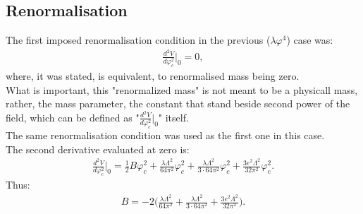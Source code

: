 \subsection{Renormalisation}\label{CW_renormalisation_scalar_el}
The first imposed renormalisation condition in the previous ($\lambda\varphi^4$) case was:
\begin{align}\label{phitoforth condition}
\frac{d^2V}{d\varphi_c^2}\Big|_0=0,
\end{align}
where, it was stated, is equivalent, to renormalised mass being zero. \\
What is important, this "renormalized mass" is not meant to be a physicall mass, rather, 
the mass parameter, the constant that stand beside second power of the field, 
which can be defined as "$\frac{d^2V}{d\varphi_c^2}\Big|_0$" itself. \\
The same renormalisation condition was used as the first one in this case. \\
The second derivative evaluated at zero is:
\begin{align}
\frac{d^2V}{d\varphi_c^2}\Big|_0 = 
\frac{1}{2}B\varphi_c^2 + 
\frac{\lambda\Lambda^2}{64\pi^2}\varphi_c^2+ 
\frac{\lambda\Lambda^2}{3\cdot 64\pi^2}\varphi_c^2+
\frac{3e^2\Lambda^2}{32\pi^2}\varphi_c^2. 
\end{align}
Thus:
\begin{align}\label{CW_B_dm}
B = -2\Big(
\frac{\lambda\Lambda^2}{64\pi^2}+ 
\frac{\lambda\Lambda^2}{3\cdot 64\pi^2}+
\frac{3e^2\Lambda^2}{32\pi^2}\Big). 
\end{align}
